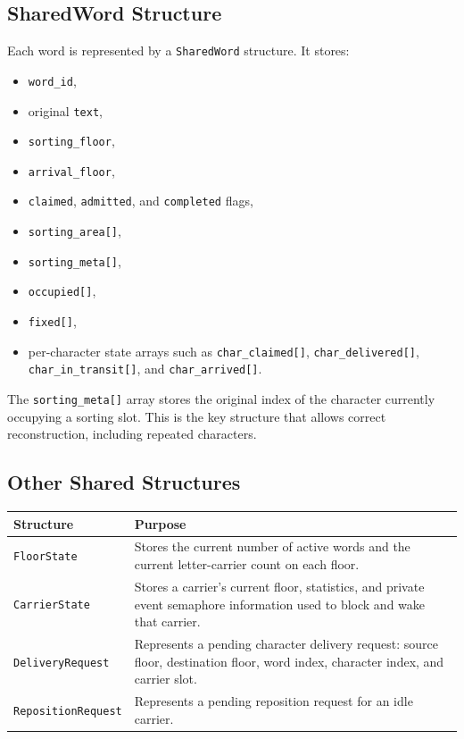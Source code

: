 \documentclass[12pt,a4paper]{article}
\begin{document}
\subsection{SharedWord Structure}

Each word is represented by a \texttt{SharedWord} structure. It stores:

\begin{itemize}[leftmargin=1.5em]
\item \texttt{word\_id},
\item original \texttt{text},
\item \texttt{sorting\_floor},
\item \texttt{arrival\_floor},
\item \texttt{claimed}, \texttt{admitted}, and \texttt{completed} flags,
\item \texttt{sorting\_area[]},
\item \texttt{sorting\_meta[]},
\item \texttt{occupied[]},
\item \texttt{fixed[]},
\item per-character state arrays such as \texttt{char\_claimed[]}, \texttt{char\_delivered[]}, \texttt{char\_in\_transit[]}, and \texttt{char\_arrived[]}.
\end{itemize}

The \texttt{sorting\_meta[]} array stores the original index of the character currently occupying a sorting slot. This is the key structure that allows correct reconstruction, including repeated characters.

\subsection{Other Shared Structures}

\begin{longtable}{|P{3.6cm}|P{11.4cm}|}
\hline
\textbf{Structure} & \textbf{Purpose} \\
\hline
\texttt{FloorState} & Stores the current number of active words and the current letter-carrier count on each floor. \\
\hline
\texttt{CarrierState} & Stores a carrier's current floor, statistics, and private event semaphore information used to block and wake that carrier. \\
\hline
\texttt{DeliveryRequest} & Represents a pending character delivery request: source floor, destination floor, word index, character index, and carrier slot. \\
\hline
\texttt{RepositionRequest} & Represents a pending reposition request for an idle carrier. \\
\hline
\end{longtable}
\end{document}

